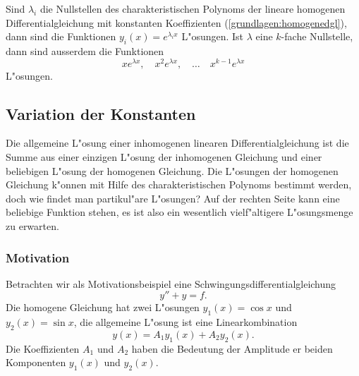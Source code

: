 \begin{satz}
Sind $\lambda_i$ die Nullstellen des charakteristischen Polynoms der
lineare homogenen Differentialgleichung mit konstanten Koeffizienten
(\ref{grundlagen:homogenedgl}), dann sind die Funktionen
$y_i(x)=e^{\lambda_i x}$ L"osungen.
Ist $\lambda$ eine $k$-fache Nullstelle, dann sind ausserdem die
Funktionen
\[
xe^{\lambda x},\quad x^2e^{\lambda x},\quad\dots\quad x^{k-1}e^{\lambda x}
\]
L"osungen.
\end{satz}

%
%

\subsection{Variation der Konstanten}
Die allgemeine L"osung einer inhomogenen linearen Differentialgleichung ist die
Summe aus einer einzigen L"osung der inhomogenen Gleichung und einer
beliebigen L"osung der homogenen Gleichung.
Die L"osungen der homogenen Gleichung k"onnen mit Hilfe des charakteristischen
Polynoms bestimmt werden, doch wie findet man partikul"are L"osungen?
Auf der rechten Seite kann eine beliebige Funktion stehen, es ist also
ein wesentlich vielf"altigere L"osungsmenge zu erwarten.

\subsubsection{Motivation}
Betrachten wir als Motivationsbeispiel eine Schwingungsdifferentialgleichung
\[
y''+y=f.
\]
Die homogene Gleichung hat zwei L"osungen $y_1(x)=\cos x$ und $y_2(x)=\sin x$,
die allgemeine L"osung ist eine Linearkombination 
\[
y(x)=A_1y_1(x)+A_2y_2(x).
\]
Die Koeffizienten $A_1$ und $A_2$ haben die Bedeutung der Amplitude er
beiden Komponenten $y_1(x)$ und $y_2(x)$.

